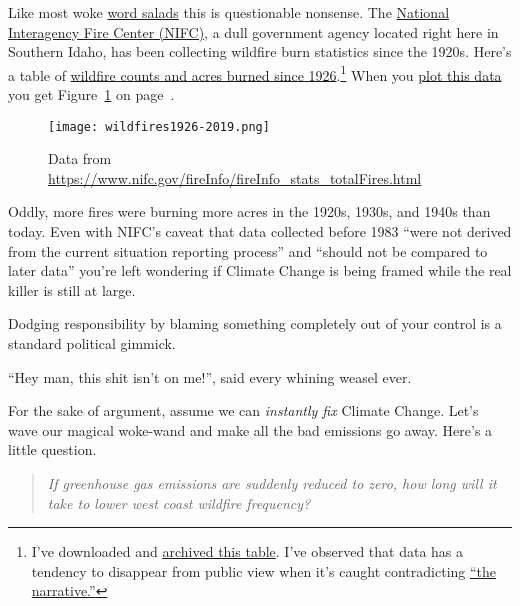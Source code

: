 Like most woke \href{https://www.dictionary.com/browse/word-salad}{word
salads} this is questionable nonsense. The
\href{https://www.nifc.gov/index.html}{National Interagency Fire Center
(NIFC)}, a dull government agency located right here in Southern Idaho,
has been collecting wildfire burn statistics since the 1920s. Here's a
table of
\href{https://www.nifc.gov/fireInfo/fireInfo_stats_totalFires.html}{wildfire
counts and acres burned since
1926}.\footnote{ I've downloaded and
  \href{https://github.com/bakerjd99/jacks/blob/master/notebooks/NationalFireData.txt}{archived
  this table}. I've observed that data has a tendency to disappear from
  public view when it's caught contradicting
  \href{https://www.urbandictionary.com/define.php?term=pushing\%20a\%20false\%20narrative}{``the
  narrative.''}
} When you %
\href{https://github.com/bakerjd99/jacks/blob/master/notebooks/wildfire\%20plot.ipynb}{plot
this data} you get Figure~\ref{fig:7007x0} on page~\pageref{fig:7007x0}.

\captionsetup[figure]{labelformat=default}
\begin{figure}[htbp]
\centering
\texttt{[image: wildfires1926-2019.png]}
\caption{Data from
\url{https://www.nifc.gov/fireInfo/fireInfo\_stats\_totalFires.html}}
\label{fig:7007x0}
\end{figure}

Oddly, more fires were burning more acres in the 1920s, 1930s, and 1940s
than today. Even with NIFC's caveat that data collected before 1983
``were not derived from the current situation reporting process'' and
``should not be compared to later data'' you're left wondering if
Climate Change is being framed while the real killer is still at large.

Dodging responsibility by blaming something completely out of your
control is a standard political gimmick.

``Hey man, this shit isn't on me!'', said every whining weasel ever.

For the sake of argument, assume we can \emph{instantly fix} Climate
Change. Let's wave our magical woke-wand and make all the bad emissions
go away. Here's a little question.

\begin{quote}
\emph{If greenhouse gas emissions are suddenly reduced to zero, how long
will it take to lower west coast wildfire frequency?}
\end{quote}

